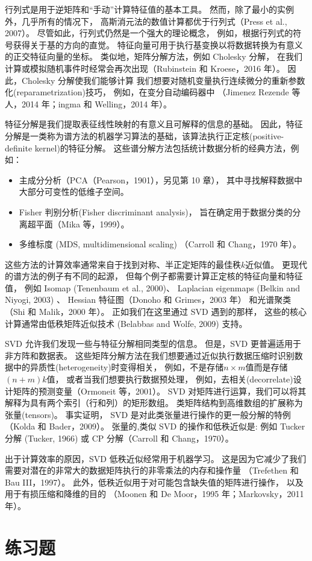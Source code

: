 行列式是用于逆矩阵和“手动”计算特征值的基本工具。
然而，除了最小的实例外，几乎所有的情况下，
高斯消元法的数值计算都优于行列式（Press et al., 2007）。
尽管如此，行列式仍然是一个强大的理论概念，
例如，根据行列式的符号获得关于基的方向的直觉。
特征向量可用于执行基变换以将数据转换为有意义的正交特征向量的坐标。
类似地，矩阵分解方法，例如 Cholesky 分解，
在我们计算或模拟随机事件时经常会再次出现（Rubinstein 和 Kroese，2016 年）。
因此，Cholesky 分解使我们能够计算
我们想要对随机变量执行连续微分的重新参数化(reparametrization)技巧，
例如，在变分自动编码器中
（Jimenez Rezende 等人，2014 年；ingma 和 Welling，2014 年）。

特征分解是我们提取表征线性映射的有意义且可解释的信息的基础。
因此，特征分解是一类称为谱方法的机器学习算法的基础，该算法执行正定核(positive-definite kernel)的特征分解。
这些谱分解方法包括统计数据分析的经典方法，例如：
\begin{itemize}
    \item
    主成分分析（PCA（Pearson，1901），另见第 10 章），
    其中寻找解释数据中大部分可变性的低维子空间。
    \item
    Fisher 判别分析(Fisher discriminant analysis)，
    旨在确定用于数据分类的分离超平面（Mika 等，1999）。
    \item
    多维标度 (MDS, multidimensional scaling)
    （Carroll 和 Chang，1970 年）。
\end{itemize}
这些方法的计算效率通常来自于找到对称、半正定矩阵的最佳秩$k$近似值。
更现代的谱方法的例子有不同的起源，
但每个例子都需要计算正定核的特征向量和特征值，
例如 Isomap (Tenenbaum et al., 2000)、
Laplacian eigenmaps (Belkin and Niyogi, 2003) 、
Hessian 特征图（Donoho 和 Grimes，2003 年）
和光谱聚类（Shi 和 Malik，2000 年）。
正如我们在这里通过 SVD 遇到的那样，
这些的核心计算通常由低秩矩阵近似技术 (Belabbas and Wolfe, 2009) 支持。

SVD 允许我们发现一些与特征分解相同类型的信息。
但是，SVD 更普遍适用于非方阵和数据表。
这些矩阵分解方法在我们想要通过近似执行数据压缩时识别数据中的异质性(heterogeneity)时变得相关，
例如，不是存储$n×m$值而是存储$(n+m)k$值，
或者当我们想要执行数据预处理，
例如，去相关(decorrelate)设计矩阵的预测变量（Ormoneit 等，2001）。
SVD 对矩阵进行运算，我们可以将其解释为具有两个索引（行和列）的矩形数组。
类矩阵结构到高维数组的扩展称为张量(tensors)。
事实证明，
SVD 是对此类张量进行操作的更一般分解的特例（Kolda 和 Bader，2009）。
张量的,类似 SVD 的操作和低秩近似是:
例如 Tucker 分解 (Tucker, 1966)
或 CP 分解（Carroll 和 Chang，1970）。

出于计算效率的原因，SVD 低秩近似经常用于机器学习。
这是因为它减少了我们需要对潜在的非常大的数据矩阵执行的非零乘法的内存和操作量
（Trefethen 和 Bau III，1997）。
此外，低秩近似用于对可能包含缺失值的矩阵进行操作，
以及用于有损压缩和降维的目的
（Moonen 和 De Moor，1995 年；Markovsky，2011 年）。

\section*{练习题}
